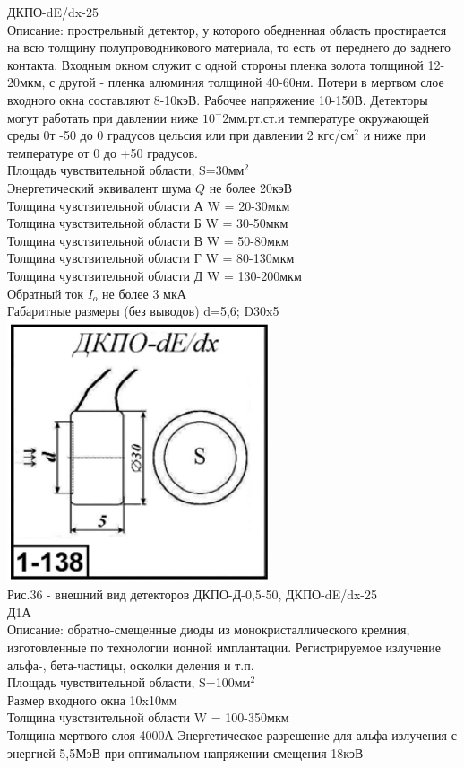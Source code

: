 \documentclass[11pt]{report}
\begin{document}
ДКПО-dE/dx-25\\
Описание: прострельный детектор, у которого обедненная область простирается на всю толщину полупроводникового материала, то есть от переднего до заднего контакта. Входным окном служит с одной стороны пленка золота толщиной 12-20мкм, с другой - пленка алюминия толщиной 40-60нм. Потери в мертвом слое входного окна составляют 8-10кэВ. Рабочее напряжение 10-150В. Детекторы могут работать при давлении ниже $10^-2$мм.рт.ст.и температуре окружающей среды 0т -50 до 0 градусов цельсия или при давлении 2 кгс/см$^2$ и ниже при температуре от 0 до +50 градусов. \\
Площадь чувствительной области, S=30мм$^2$ \\
Энергетический эквивалент шума $Q$ не более 20кэВ\\
Толщина чувствительной области А W = 20-30мкм \\
Толщина чувствительной области Б W = 30-50мкм \\
Толщина чувствительной области В W = 50-80мкм \\
Толщина чувствительной области Г W = 80-130мкм \\
Толщина чувствительной области Д W = 130-200мкм \\
Обратный ток $I_{o}$ не более 3 мкА \\
Габаритные размеры (без выводов) d=5,6; D30x5 \\

\includegraphics[scale=0.4]{dkpo_de_dx} \\
Рис.36 - внешний вид детекторов  ДКПО-Д-0,5-50, ДКПО-dE/dx-25\\

Д1А\\
Описание: обратно-смещенные диоды из монокристаллического кремния, изготовленные по технологии ионной имплантации. Регистрируемое излучение альфа-, бета-частицы, осколки деления и т.п.\\
Площадь чувствительной области, S=100мм$^2$ \\
Размер входного окна 10x10мм \\
Толщина чувствительной области W = 100-350мкм \\
Толщина мертвого слоя 4000А
Энергетическое разрешение для альфа-излучения с энергией 5,5МэВ при оптимальном напряжении смещения 18кэВ \\
\end{document}

